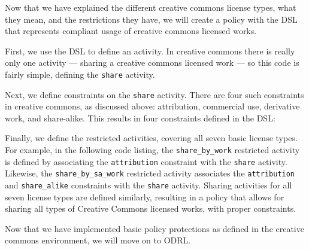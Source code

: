 Now that we have explained the different creative commons license types, what they mean, and the restrictions they have, we will create a policy with the DSL that represents compliant usage of creative commons licensed works.

First, we use the DSL to define an activity.  In creative commons there is really only one activity ---  sharing a creative commons licensed work --- so this code is fairly simple, defining the \texttt{share} activity.



Next, we define constraints on the \texttt{share} activity.  There are four such constraints in creative commons, as discussed above: attribution, commercial use, derivative work, and share-alike.  This results in four constraints defined in the DSL:



Finally, we define the restricted activities, covering all seven basic license types.  For example, in the following code listing, the \texttt{share\_by\_work} restricted activity is defined by associating the \texttt{attribution} constraint with the \texttt{share} activity. Likewise, the \texttt{share\_by\_sa\_work} restricted activity associates the \texttt{attribution} and \texttt{share\_alike} constraints with the \texttt{share} activity.  Sharing activities for all seven license types are defined similarly, resulting in a policy that allows for sharing all types of Creative Commons licensed works, with proper constraints.



Now that we have implemented basic policy protections as defined in the creative commons environment, we will move on to ODRL.